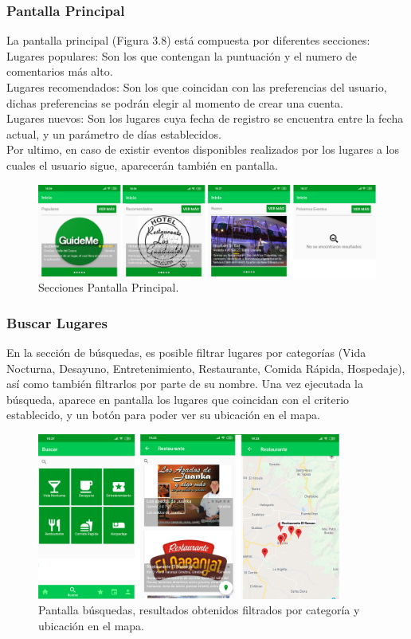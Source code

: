\documentclass[12pt,letterpaper,openany]{book}
\begin{document}
\subsubsection{Pantalla Principal}
La pantalla principal (Figura 3.8) está compuesta por diferentes secciones: \\
Lugares populares: Son los que contengan la puntuación y el numero de comentarios más alto.\\
Lugares recomendados: Son los que coincidan con las preferencias del usuario, dichas preferencias se podrán elegir al momento de crear una cuenta.\\
Lugares nuevos: Son los lugares cuya fecha de registro se encuentra entre la fecha actual, y un parámetro de días establecidos.\\
Por ultimo, en caso de existir eventos disponibles realizados por los lugares a los cuales el usuario sigue, aparecerán también  en pantalla.
\begin{figure}[H]
\begin{center}
\includegraphics[width=14cm]{./imagenes/1}
\caption{Secciones Pantalla Principal.}
\end{center}
\end{figure}

\subsubsection{Buscar Lugares}
En la sección de búsquedas, es posible filtrar lugares por categorías (Vida Nocturna, Desayuno, Entretenimiento, Restaurante, Comida Rápida, Hospedaje), así como también filtrarlos por parte de su nombre.
\vspace{5mm}\newline
Una vez ejecutada la búsqueda, aparece en pantalla los lugares que coincidan con el criterio establecido, y un botón para poder ver su ubicación en el mapa.
\begin{figure}[H]
\begin{center}
\includegraphics[width=10cm]{./imagenes/2}
\caption{Pantalla búsquedas, resultados obtenidos filtrados por categoría y ubicación en el mapa.}
\end{center}
\end{figure}
\end{document}
